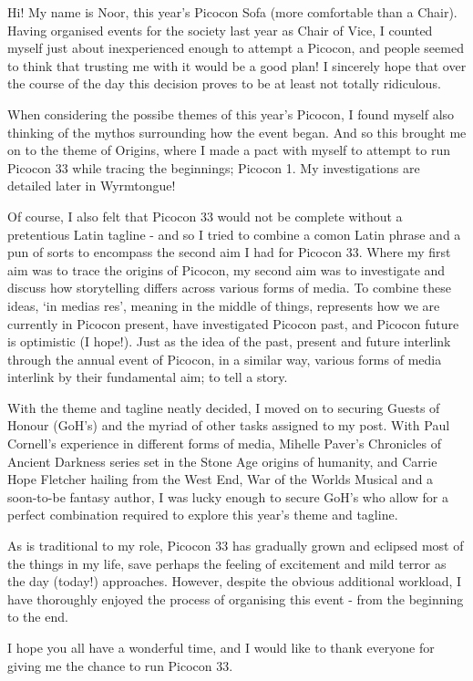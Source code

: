 
Hi! My name is Noor, this year's Picocon Sofa (more comfortable than a Chair). Having organised events for the society last year as Chair of Vice, I counted myself just about inexperienced enough to attempt a Picocon, and people seemed to think that trusting me with it would be a good plan! I sincerely hope that over the course of the day this decision proves to be at least not totally ridiculous.

When considering the possibe themes of this year's Picocon, I found myself also thinking of the mythos surrounding how the event began. And so this brought me on to the theme of Origins, where I made a pact with myself to attempt to run Picocon 33 while tracing the beginnings; Picocon 1. My investigations are detailed later in Wyrmtongue!

Of course, I also felt that Picocon 33 would not be complete without a pretentious Latin tagline - and so I tried to combine a comon Latin phrase and a pun of sorts to encompass the second aim I had for Picocon 33. Where my first aim was to trace the origins of Picocon, my second aim was to investigate and discuss how storytelling differs across various forms of media. To combine these ideas, `in medias res', meaning in the middle of things, represents how we are currently in Picocon present, have investigated Picocon past, and Picocon future is optimistic (I hope!). Just as the idea of the past, present and future interlink through the annual event of Picocon, in a similar way, various forms of media interlink by their fundamental aim; to tell a story.

With the theme and tagline neatly decided, I moved on to securing Guests of Honour (GoH's) and the myriad of other tasks assigned to my post. With Paul Cornell's experience in different forms of media, Mihelle Paver's Chronicles of Ancient Darkness series set in the Stone Age origins of humanity, and Carrie Hope Fletcher hailing from the West End, War of the Worlds Musical and a soon-to-be fantasy author, I was lucky enough to secure GoH's who allow for a perfect combination required to explore this year's theme and tagline. 

As is traditional to my role, Picocon 33 has gradually grown and eclipsed most of the things in my life, save perhaps the feeling of excitement and mild terror as the day (today!) approaches. However, despite the obvious additional workload, I have thoroughly enjoyed the process of organising this event - from the beginning to the end.

I hope you all have a wonderful time, and I would like to thank everyone for giving me the chance to run Picocon 33.